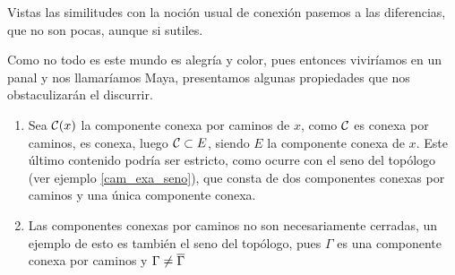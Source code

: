 Vistas las similitudes con la noción usual de conexión pasemos a las diferencias, que no son pocas, aunque si sutiles.
\begin{obs}
	Como no todo es este mundo es alegría y color, pues entonces viviríamos en un panal y nos llamaríamos Maya, presentamos algunas propiedades que nos obstaculizarán el discurrir.
	\begin{enumerate}
		\item Sea $\mathcal{C}(x)$ la componente conexa por caminos de $x$, como $\mathcal{C}$ es conexa por caminos, es conexa, luego $\mathcal{C}\subset E$, siendo $E$ la componente conexa de $x$. Este último contenido podría ser estricto, como ocurre con el seno del topólogo (ver ejemplo \ref{cam_exa_seno}), que consta de dos componentes conexas por caminos y una única componente conexa.
		\item Las componentes conexas por caminos no son necesariamente cerradas, un ejemplo de esto es también el seno del topólogo, pues $\Gamma$ es una componente conexa por caminos y $\Gamma\not=\overline{\Gamma}$\qedhere
	\end{enumerate}
\end{obs}

